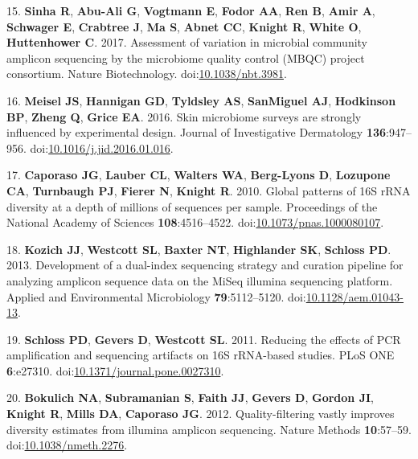 \documentclass[11pt,]{article}
\begin{document}
\leavevmode\hypertarget{ref-Sinha2017}{}%
15. \textbf{Sinha R}, \textbf{Abu-Ali G}, \textbf{Vogtmann E},
\textbf{Fodor AA}, \textbf{Ren B}, \textbf{Amir A}, \textbf{Schwager E},
\textbf{Crabtree J}, \textbf{Ma S}, \textbf{Abnet CC}, \textbf{Knight
R}, \textbf{White O}, \textbf{Huttenhower C}. 2017. Assessment of
variation in microbial community amplicon sequencing by the microbiome
quality control (MBQC) project consortium. Nature Biotechnology.
doi:\href{https://doi.org/10.1038/nbt.3981}{10.1038/nbt.3981}.

\leavevmode\hypertarget{ref-Meisel2016}{}%
16. \textbf{Meisel JS}, \textbf{Hannigan GD}, \textbf{Tyldsley AS},
\textbf{SanMiguel AJ}, \textbf{Hodkinson BP}, \textbf{Zheng Q},
\textbf{Grice EA}. 2016. Skin microbiome surveys are strongly influenced
by experimental design. Journal of Investigative Dermatology
\textbf{136}:947--956.
doi:\href{https://doi.org/10.1016/j.jid.2016.01.016}{10.1016/j.jid.2016.01.016}.

\leavevmode\hypertarget{ref-Caporaso2010}{}%
17. \textbf{Caporaso JG}, \textbf{Lauber CL}, \textbf{Walters WA},
\textbf{Berg-Lyons D}, \textbf{Lozupone CA}, \textbf{Turnbaugh PJ},
\textbf{Fierer N}, \textbf{Knight R}. 2010. Global patterns of 16S rRNA
diversity at a depth of millions of sequences per sample. Proceedings of
the National Academy of Sciences \textbf{108}:4516--4522.
doi:\href{https://doi.org/10.1073/pnas.1000080107}{10.1073/pnas.1000080107}.

\leavevmode\hypertarget{ref-Kozich2013}{}%
18. \textbf{Kozich JJ}, \textbf{Westcott SL}, \textbf{Baxter NT},
\textbf{Highlander SK}, \textbf{Schloss PD}. 2013. Development of a
dual-index sequencing strategy and curation pipeline for analyzing
amplicon sequence data on the MiSeq illumina sequencing platform.
Applied and Environmental Microbiology \textbf{79}:5112--5120.
doi:\href{https://doi.org/10.1128/aem.01043-13}{10.1128/aem.01043-13}.

\leavevmode\hypertarget{ref-Schloss2011}{}%
19. \textbf{Schloss PD}, \textbf{Gevers D}, \textbf{Westcott SL}. 2011.
Reducing the effects of PCR amplification and sequencing artifacts on
16S rRNA-based studies. PLoS ONE \textbf{6}:e27310.
doi:\href{https://doi.org/10.1371/journal.pone.0027310}{10.1371/journal.pone.0027310}.

\leavevmode\hypertarget{ref-Bokulich2012}{}%
20. \textbf{Bokulich NA}, \textbf{Subramanian S}, \textbf{Faith JJ},
\textbf{Gevers D}, \textbf{Gordon JI}, \textbf{Knight R}, \textbf{Mills
DA}, \textbf{Caporaso JG}. 2012. Quality-filtering vastly improves
diversity estimates from illumina amplicon sequencing. Nature Methods
\textbf{10}:57--59.
doi:\href{https://doi.org/10.1038/nmeth.2276}{10.1038/nmeth.2276}.
\end{document}
